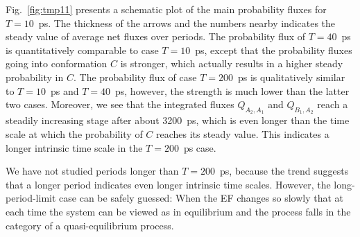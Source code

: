 \documentclass[a4paper,preprint,unsortedaddress,onecolumn]{revtex4-1}
\newcommand{\recheck}[1]{{\color{red} #1}}
\begin{document}
Fig.~\ref{fig:tmp11} presents
a schematic plot of the main probability fluxes for $T=10$~ps.
The thickness of the arrows and the numbers nearby indicates
\recheck{the steady value of average net fluxes over periods}.
The probability flux of $T=40$~ps is quantitatively
comparable to case $T=10$~ps, except that the probability fluxes
going into conformation $C$ is stronger, which actually results in
a higher steady probability in $C$.
The probability flux of case $T=200$~ps is qualitatively
similar to $T=10$~ps and $T=40$~ps, however,
the strength is much lower than the latter two cases.
Moreover, \recheck{
  we see that the integrated fluxes $Q_{A_2,A_1}$ and $Q_{B_1,A_2}$ reach
  a steadily
increasing stage after about 3200~ps}, which is even longer than the time scale
at which the probability of $C$ reaches its steady value. This indicates
a longer intrinsic time scale in the $T=200$~ps case.

We have not studied periods longer than $T=200$~ps, because
the trend suggests that a longer period indicates even longer intrinsic time scales.
However, the long-period-limit case can be safely guessed: When
the EF changes so slowly that
at each time the system
can be viewed as in equilibrium and
the process falls in the category of a quasi-equilibrium
process. 



\end{document}
